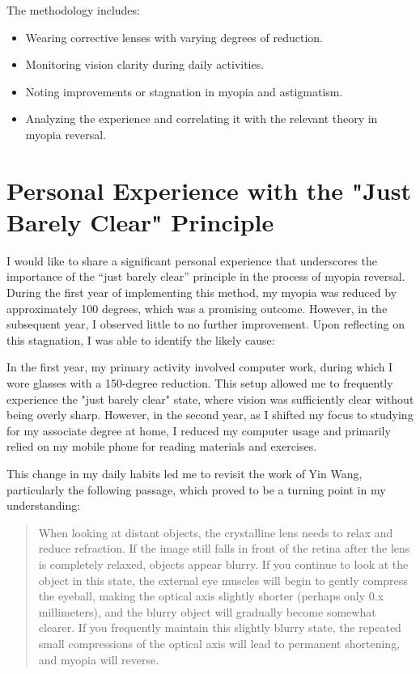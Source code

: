 \documentclass[12pt]{article}
\begin{document}
The methodology includes:
\begin{itemize}
    \item Wearing corrective lenses with varying degrees of reduction.
    \item Monitoring vision clarity during daily activities.
    \item Noting improvements or stagnation in myopia and astigmatism.
    \item Analyzing the experience and correlating it with the relevant theory in myopia reversal.
\end{itemize}

\section{Personal Experience with the "Just Barely Clear" Principle}
I would like to share a significant personal experience that underscores the importance of the “just barely clear” principle in the process of myopia reversal. During the first year of implementing this method, my myopia was reduced by approximately 100 degrees, which was a promising outcome. However, in the subsequent year, I observed little to no further improvement. Upon reflecting on this stagnation, I was able to identify the likely cause:

In the first year, my primary activity involved computer work, during which I wore glasses with a 150-degree reduction. This setup allowed me to frequently experience the "just barely clear" state, where vision was sufficiently clear without being overly sharp. However, in the second year, as I shifted my focus to studying for my associate degree at home, I reduced my computer usage and primarily relied on my mobile phone for reading materials and exercises.

This change in my daily habits led me to revisit the work of Yin Wang, particularly the following passage, which proved to be a turning point in my understanding:

\begin{quote}
    When looking at distant objects, the crystalline lens needs to relax and reduce refraction. If the image still falls in front of the retina after the lens is completely relaxed, objects appear blurry. If you continue to look at the object in this state, the external eye muscles will begin to gently compress the eyeball, making the optical axis slightly shorter (perhaps only 0.x millimeters), and the blurry object will gradually become somewhat clearer. If you frequently maintain this slightly blurry state, the repeated small compressions of the optical axis will lead to permanent shortening, and myopia will reverse.
\end{quote}
\end{document}
